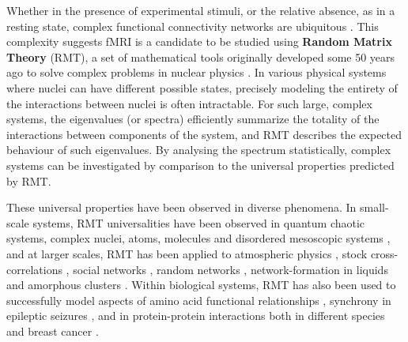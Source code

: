 \documentclass[NETN,manuscript]{stjour-new}
\begin{document}
Whether in the presence of experimental stimuli, or the relative absence, as in a resting state,
complex functional connectivity networks are ubiquitous
\citep{bucknerBrainDefaultNetwork2008,foxCoverHumanBrain2005,gonzalez-castilloTaskbasedDynamicFunctional2018,hermundstadStructuralFoundationsRestingstate2013}.
This complexity suggests fMRI is a candidate to be studied using \textbf{Random Matrix Theory} (RMT), a set
of mathematical tools originally developed some 50 years ago to solve complex problems in nuclear
physics \citep{guhrRandommatrixTheoriesQuantum1998a,mehtaRandomMatrices2004}. In various
physical systems where nuclei can have different possible states, precisely modeling the entirety of
the interactions between nuclei is often intractable. For such large, complex systems, the
eigenvalues (or spectra) efficiently summarize the totality of the interactions between components
of the system, and RMT describes the expected behaviour of such eigenvalues. By analysing the
spectrum statistically, complex systems can be investigated by comparison to the universal
properties predicted by RMT.

\begin{sloppypar}
These universal properties have been observed in diverse phenomena. In small-scale systems, RMT
universalities have been observed in quantum chaotic systems, complex nuclei, atoms, molecules and
disordered mesoscopic systems
\citep{guhrRandommatrixTheoriesQuantum1998a,mehtaRandomMatrices2004,brodyRandommatrixPhysicsSpectrum1981,beenakkerRandommatrixTheoryQuantum1997,bohigasHigherOrderCorrelationsSpectra1985,wintgenLevelStatisticsQuantized1988,pandeySkewOrthogonalPolynomialsUniversality2001},
and at larger scales, RMT has been applied to atmospheric physics
\citep{santhanamStatisticsAtmosphericCorrelations2001}, stock cross-correlations
\citep{plerouRandomMatrixApproach2002} , social networks
\citep{jalanUncoveringRandomnessSuccess2014}, random networks
\citep{bandyopadhyayUniversalityComplexNetworks2007}, network-formation in liquids
\citep{sastrySpectralStatisticsInstantaneous2001,matharooSpectralStatisticsQuenched2009}  and
amorphous clusters
\citep{sarkarUniversalityVibrationalSpectra2004,matharooVibrationalSpectraAmorphous2005,matharooUniversalityVibrationalSpectra2008}.
Within biological systems, RMT has also been used to successfully model aspects of  amino acid
functional relationships \citep{bhadolaTargetingFunctionalMotifs2016}, synchrony in epileptic
seizures \citep{osorioPhasesynchronizationRandommatrixBased2011}, and in protein-protein
interactions both in different species \citep{agrawalQuantifyingRandomnessProtein2014} and breast
cancer \citep{raiRandomnessPreservedPatterns2015}.
\end{sloppypar}
\end{document}
